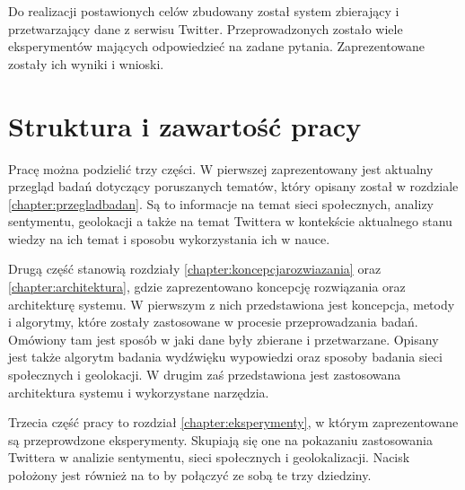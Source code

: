 Do realizacji postawionych celów zbudowany został system
zbierający i przetwarzający dane z serwisu Twitter. Przeprowadzonych zostało
wiele eksperymentów mających odpowiedzieć na zadane pytania. Zaprezentowane
zostały ich wyniki i wnioski.

\section{Struktura i zawartość pracy}
Pracę można podzielić trzy części. W pierwszej zaprezentowany jest
aktualny przegląd badań dotyczący poruszanych tematów, który
opisany został w rozdziale \ref{chapter:przegladbadan}. Są to 
informacje na temat sieci społecznych, analizy sentymentu, geolokacji
a także na temat Twittera w kontekście aktualnego stanu wiedzy na ich temat i
sposobu wykorzystania ich w nauce.

Drugą część stanowią rozdziały \ref{chapter:koncepcjarozwiazania} oraz
\ref{chapter:architektura}, gdzie zaprezentowano koncepcję
rozwiązania oraz architekturę systemu. W pierwszym z nich przedstawiona jest
koncepcja, metody i algorytmy, które zostały zastosowane w procesie
przeprowadzania badań. Omówiony tam jest sposób w jaki dane były
zbierane i przetwarzane. Opisany jest także algorytm badania wydźwięku
wypowiedzi oraz sposoby badania sieci społecznych i geolokacji. W drugim zaś
przedstawiona jest zastosowana architektura systemu i wykorzystane narzędzia.

Trzecia część pracy to rozdział \ref{chapter:eksperymenty}, w którym
zaprezentowane są przeprowdzone eksperymenty. Skupiają się one na pokazaniu
zastosowania Twittera w analizie sentymentu, sieci społecznych i geolokalizacji.
Nacisk położony jest również na to by połączyć ze sobą te trzy dziedziny.


